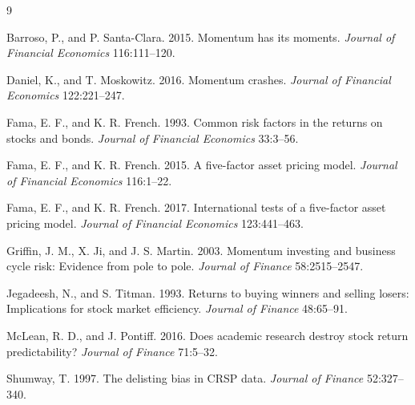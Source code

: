 \documentclass[11pt]{article}
\begin{document}
\begin{thebibliography}{9}

Barroso, P., and P. Santa-Clara. 2015. Momentum has its moments. \emph{Journal of Financial Economics} 116:111--120.

Daniel, K., and T. Moskowitz. 2016. Momentum crashes. \emph{Journal of Financial Economics} 122:221--247.

Fama, E. F., and K. R. French. 1993. Common risk factors in the returns on stocks and bonds. \emph{Journal of Financial Economics} 33:3--56.

Fama, E. F., and K. R. French. 2015. A five-factor asset pricing model. \emph{Journal of Financial Economics} 116:1--22.

Fama, E. F., and K. R. French. 2017. International tests of a five-factor asset pricing model. \emph{Journal of Financial Economics} 123:441--463.

Griffin, J. M., X. Ji, and J. S. Martin. 2003. Momentum investing and business cycle risk: Evidence from pole to pole. \emph{Journal of Finance} 58:2515--2547.

Jegadeesh, N., and S. Titman. 1993. Returns to buying winners and selling losers: Implications for stock market efficiency. \emph{Journal of Finance} 48:65--91.

McLean, R. D., and J. Pontiff. 2016. Does academic research destroy stock return predictability? \emph{Journal of Finance} 71:5--32.

Shumway, T. 1997. The delisting bias in CRSP data. \emph{Journal of Finance} 52:327--340.

\end{thebibliography}
\end{document}
